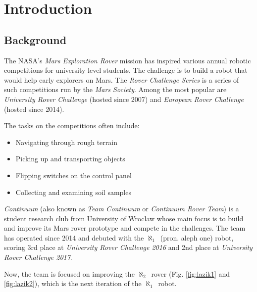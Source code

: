 \documentclass[english,inz,shortabstract]{iithesis}
\author         {Błażej Sowa}
\newcommand{\oldrovername}{$\aleph_1$\ }
\newcommand{\rovername}{$\aleph_2$\ }
\begin{document}
\chapter{Introduction}

\section{Background}
The NASA's \textit{Mars Exploration Rover} mission has inspired various annual robotic competitions for university level students. The challenge is to build a robot that would help early explorers on Mars. 
The \textit{Rover Challenge Series} is a series of such competitions run by the \textit{Mars Society}. Among the most popular are \textit{University Rover Challenge} (hosted since 2007) and \textit{European Rover Challenge} (hosted since 2014).

The tasks on the competitions often include:
\begin{itemize}[itemsep=0pt, parsep=2pt, topsep=0pt]
	\item Navigating through rough terrain
	\item Picking up and transporting objects
	\item Flipping switches on the control panel 
	\item Collecting and examining soil samples
\end{itemize}

\textit{Continuum} (also known as \textit{Team Continuum} or \textit{Continuum Rover Team}) is a student research club from University of Wroclaw whose main focus is to build and improve its Mars rover prototype and compete in the challenges. The team has operated since 2014 and debuted with the \oldrovername (pron. aleph one) robot, scoring 3rd place at \textit{University Rover Challenge 2016} and 2nd place at \textit{University Rover Challenge 2017}.

Now, the team is focused on improving the \rovername rover (Fig. \ref{fig:lazik1} and \ref{fig:lazik2}), which is the next iteration of the \oldrovername robot. 
\end{document}
